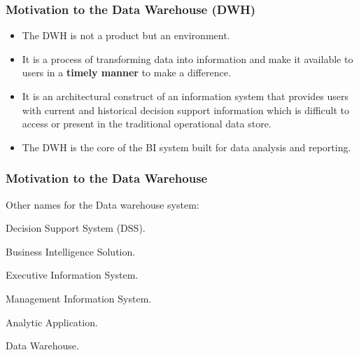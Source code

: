 
\begin{frame}
\frametitle{Motivation to the Data Warehouse (DWH)}

\begin{itemize}[<+->]
	\item The DWH is not a product but an environment.
	\item It is a process of transforming data into information and make it available to users in a \textbf{timely manner} to make a difference.
	\item It is an architectural construct of an information system that provides users with current and historical decision support information which is difficult to access or present in the traditional operational data store.
	\item The DWH is the core of the BI system built for data analysis and reporting.
\end{itemize}

\end{frame}


\begin{frame}
\frametitle{Motivation to the Data Warehouse}

Other names for the Data warehouse system:

\begin{wideitemize}
\item Decision Support System (DSS).
\item Business Intelligence Solution.
\item Executive Information System.
\item Management Information System.
\item Analytic Application.
\item Data Warehouse.

\end{wideitemize}


\end{frame}

